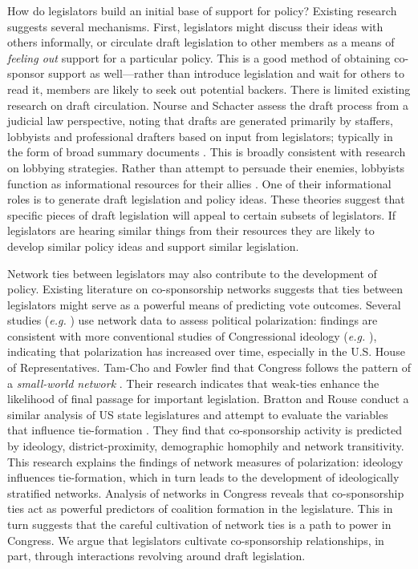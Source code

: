 \documentclass[pdftex,12pt]{llncs}
\begin{document}
How do legislators build an initial base of support for policy? 
Existing research suggests several mechanisms. 
First, legislators might discuss their ideas with others informally, or circulate draft legislation to other members as a means of \textit{feeling out} support for a particular policy. 
This is a good method of obtaining co-sponsor support as well---rather than introduce legislation and wait for others to read it, members are likely to seek out potential backers. 
There is limited existing research on draft circulation. 
Nourse and Schacter assess the draft process from a judicial law perspective, noting that drafts are generated primarily by staffers, lobbyists and professional drafters based on input from legislators; typically in the form of broad summary documents \parencite{ns02}. 
This is broadly consistent with research on lobbying strategies. 
Rather than attempt to persuade their enemies, lobbyists function as informational resources for their allies \parencite{hw90, hk98}. 
One of their informational roles is to generate draft legislation and policy ideas. 
These theories suggest that specific pieces of draft legislation will appeal to certain subsets of legislators. 
If legislators are hearing similar things from their resources they are likely to develop similar policy ideas and support similar legislation.  

Network ties between legislators may also contribute to the development of policy. Existing literature on co-sponsorship networks suggests that ties between legislators might serve as a powerful means of predicting vote outcomes. 
Several studies (\textit{e.g.} \cite{zftpfm08}) use network data to assess political polarization: findings are consistent with more conventional studies of Congressional ideology (\textit{e.g.} \cite{pr97}), indicating that polarization has increased over time, especially in the U.S. House of Representatives. 
Tam-Cho and Fowler find that Congress follows the pattern of a \textit{small-world network} \parencite{tf10}. 
Their research indicates that weak-ties enhance the likelihood of final passage for important legislation. 
Bratton and Rouse conduct a similar analysis of US state legislatures and attempt to evaluate the variables that influence tie-formation \parencite{br11}. 
They find that co-sponsorship activity is predicted by ideology, district-proximity, demographic homophily and network transitivity. 
This research explains the findings of network measures of polarization: ideology influences tie-formation, which in turn leads to the development of ideologically stratified networks. 
Analysis of networks in Congress reveals that co-sponsorship ties act as powerful predictors of coalition formation in the legislature. 
This in turn suggests that the careful cultivation of network ties is a path to power in Congress. 
We argue that legislators cultivate co-sponsorship relationships, in part, through interactions revolving around draft legislation.
\end{document}
